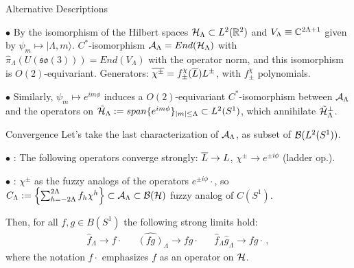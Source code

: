 \begin{frame}{Alternative Descriptions} %

     $\bullet$ By the isomorphism of the Hilbert spaces $\mathcal H_\Lambda \subset L^2(\mathbb R^2)$ and $V_\Lambda \equiv \mathbb C^{2\Lambda + 1}$ given by $\psi_m \mapsto |\Lambda, m\rangle$. \Then $C^*$-isomorphism $\mathcal A_\Lambda = End(\mathcal H_\Lambda)$ with $\hat \pi_\Lambda(U(\mathfrak{so}(3))) = End(V_\Lambda)$ with the operator norm, and this isomorphism is $O(2)$-equivariant. Generators: $\overline{\chi^\pm} = f^\chi_{\pm}(\overline{L}) L^\pm$, with $f^\chi_\pm$ polynomials.
     
     $\bullet$ Similarly, $\psi_m \mapsto e^{im\phi}$ induces a $O(2)$-equivariant $C^*$-isomorphism between $\mathcal A_\Lambda$ and the operators on $\tilde {\mathcal H}_\Lambda := span\{e^{im\phi}\}_{|m| \leq \Lambda} \subset L^2(S^1) $, which annihilate $\tilde {\mathcal H}_\Lambda^\perp$.



    
    \end{frame}

\begin{frame}{Convergence} %
    Let's take the last characterization of $\mathcal A_\Lambda$, as subset of $\mathcal B(L^2(S^1))$.

    
    $\bullet$ : The following operators converge strongly: $\overline{L} \to L$, $\chi^\pm \to e^{\pm i\phi}$ (ladder op.).
    
    $\bullet$ : $\chi^\pm$ as the fuzzy analogs of the operators $e^{\pm i\phi}\cdot$, so $C_\Lambda := \left\{ \sum_{h = -2\Lambda}^{2\Lambda} f_h \chi^h \right\} \subset \mathcal A_\Lambda \subset \mathcal B(\mathcal H)$ fuzzy analog of $C(S^1)$.  
    
    Then, for all $f, g \in B(S^1)$ the following strong limits hold:
\begin{align}
    \hat f_\Lambda \to f\cdot && \hat{(fg)}_\Lambda \to fg\cdot && \hat f_\Lambda \hat g_\Lambda \to fg \cdot\,,
\end{align}
where the notation $f\cdot$ emphasizes $f$ as an operator on $\mathcal H$.
\end{frame}

